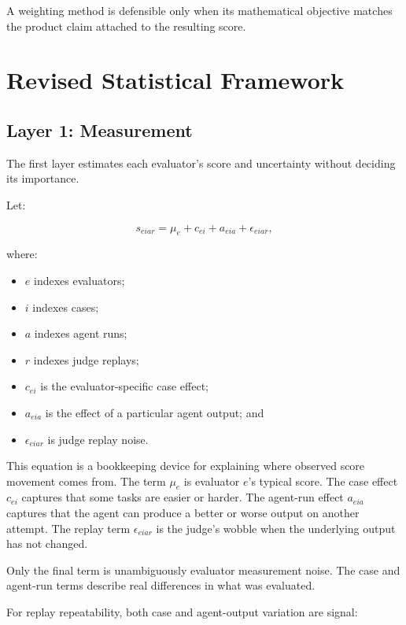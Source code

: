 \documentclass[11pt]{article}
\begin{document}
A weighting method is defensible only when its mathematical objective matches
the product claim attached to the resulting score.

\section{Revised Statistical Framework}

\subsection{Layer 1: Measurement}

The first layer estimates each evaluator's score and uncertainty without
deciding its importance.

Let:

\begin{equation}
s_{eiar}
=
\mu_e + c_{ei} + a_{eia} + \epsilon_{eiar},
\end{equation}

where:

\begin{itemize}
    \item \(e\) indexes evaluators;
    \item \(i\) indexes cases;
    \item \(a\) indexes agent runs;
    \item \(r\) indexes judge replays;
    \item \(c_{ei}\) is the evaluator-specific case effect;
    \item \(a_{eia}\) is the effect of a particular agent output; and
    \item \(\epsilon_{eiar}\) is judge replay noise.
\end{itemize}

This equation is a bookkeeping device for explaining where observed score
movement comes from. The term \(\mu_e\) is evaluator \(e\)'s typical score.
The case effect \(c_{ei}\) captures that some tasks are easier or harder. The
agent-run effect \(a_{eia}\) captures that the agent can produce a better or
worse output on another attempt. The replay term \(\epsilon_{eiar}\) is the
judge's wobble when the underlying output has not changed.

Only the final term is unambiguously evaluator measurement noise. The case and
agent-run terms describe real differences in what was evaluated.

For replay repeatability, both case and agent-output variation are signal:
\end{document}
